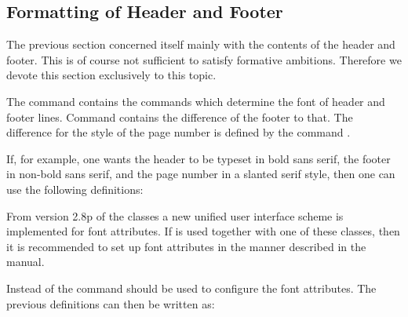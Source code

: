 \subsection{Formatting of Header and Footer}
\label{sec:scrpage-en.basics.format}
The previous section concerned itself mainly with the contents of the
header and footer. This is of course not sufficient to satisfy
formative ambitions. Therefore we devote this section exclusively to
this topic.

\begin{Declaration}
\end{Declaration}%
The command  contains the commands which determine the font of
header and footer lines.  Command  contains the difference of
the footer to that. The difference for the style of the page number is defined
by the command .
\begin{Example}
  If, for example, one wants the header to be typeset in bold sans serif, the
  footer in non-bold sans serif, and the page number in a slanted serif style,
  then one can use the following definitions:
\begin{lstcode}
  \renewcommand{\headfont}{\normalfont\sffamily\bfseries}
  \renewcommand*{\footfont}{\normalfont\sffamily}
  \renewcommand{\pnumfont}{\normalfont\rmfamily\slshape}
\end{lstcode}
\end{Example}

%
%
%
From version 2.8p of the {\KOMAScript} classes a new unified user interface
scheme is implemented for font attributes. If  is used
together with one of these classes, then it is recommended to set up font
attributes in the manner described in the \KOMAScript{} manual.
\begin{Example}
  Instead of  the command 
  should be used to configure the font attributes. The previous
  definitions can then be written as:
\begin{lstcode}
  \normalfont\sffamily\bfseries}
  \setkomafont{pagefoot}{\normalfont\sffamily}
  \setkomafont{pagenumber}{\normalfont\rmfamily\slshape}
\end{lstcode}
\end{Example}
\EndIndexGroup


